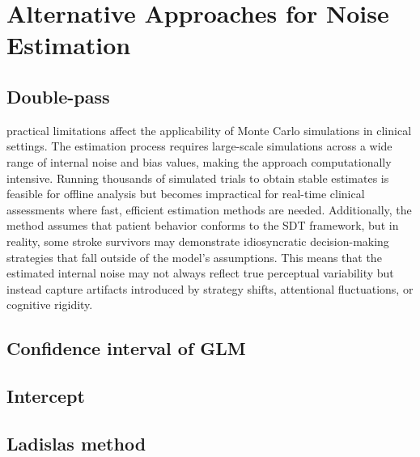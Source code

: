 \renewcommand{\chaptername}{Chapter} 
\chapter{Alternative Approaches for Noise Estimation}\label{chap6}


\section {Double-pass}

practical limitations affect the applicability of Monte Carlo simulations in clinical settings. The estimation process requires large-scale simulations across a wide range of internal noise and bias values, making the approach computationally intensive. Running thousands of simulated trials to obtain stable estimates is feasible for offline analysis but becomes impractical for real-time clinical assessments where fast, efficient estimation methods are needed. Additionally, the method assumes that patient behavior conforms to the SDT framework, but in reality, some stroke survivors may demonstrate idiosyncratic decision-making strategies that fall outside of the model’s assumptions. This means that the estimated internal noise may not always reflect true perceptual variability but instead capture artifacts introduced by strategy shifts, attentional fluctuations, or cognitive rigidity.

\section {Confidence interval of GLM} 
\section {Intercept} 
\section {Ladislas method} 

